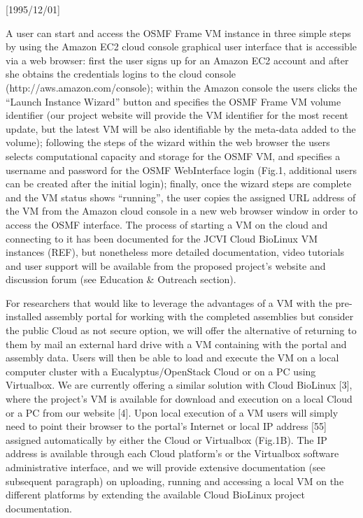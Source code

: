 \NeedsTeXFormat{LaTeX2e}[1995/12/01] \documentclass[10pt]{bmc_article}
\newenvironment{bmcformat}{\begin{raggedright}\baselineskip20pt\sloppy\setboolean{publ}{false}}{\end{raggedright}\baselineskip20pt\sloppy}
\begin{document}
\begin{bmcformat}
A user can start and access the OSMF Frame VM instance in three simple steps by using the Amazon EC2 cloud console graphical user interface that is accessible via a web browser: first the user signs up for an Amazon EC2 account and after she obtains the credentials logins to the cloud console (http://aws.amazon.com/console);  within the Amazon console the users clicks the “Launch Instance Wizard” button and specifies the OSMF Frame VM volume identifier (our project website will provide the VM identifier for the most recent update, but the latest VM will be also identifiable by the meta-data added to the volume); following the steps of the wizard within the web browser the users selects computational capacity and storage for the OSMF VM, and specifies a username and password for the OSMF WebInterface login (Fig.1, additional users can be created after the initial login); finally, once the wizard steps are complete and the VM status shows “running”, the user copies the assigned URL address of the VM from the Amazon cloud console in a new web browser window in order to access the OSMF interface. The process of starting a VM on the cloud and connecting to it has been documented for the JCVI Cloud BioLinux VM instances (REF), but nonetheless more detailed documentation, video tutorials and user support will be available from the proposed project's website and discussion forum (see Education & Outreach section).


For researchers that would like to leverage the advantages of a VM with the pre-installed assembly portal for
working with the completed assemblies but consider the public Cloud as not secure option, we will offer the
alternative of returning to them by mail an external hard drive with a VM containing with the portal and
assembly data. Users will then be able to load and execute the VM on a local computer cluster with a
Eucalyptus/OpenStack Cloud or on a PC using Virtualbox. We are currently offering a similar solution with
Cloud BioLinux [3], where the project's VM is available for download and execution on a local Cloud or a PC
from our website [4].  Upon local execution of a VM users will simply need to point their browser to the
portal's Internet or local IP address [55] assigned automatically by either the Cloud or Virtualbox (Fig.1B).
The IP address is available through each Cloud platform's or the Virtualbox software administrative
interface, and we will provide extensive documentation (see subsequent paragraph) on uploading, running and
accessing a local VM on the different platforms by extending the available Cloud BioLinux project
documentation.


\end{bmcformat}
\end{document}
